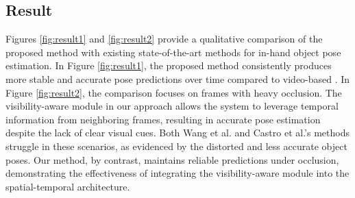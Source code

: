 \subsection{Result}

Figures \ref{fig:result1} and \ref{fig:result2} provide a qualitative comparison of the proposed method with existing state-of-the-art methods for in-hand object pose estimation. In Figure \ref{fig:result1}, the proposed method consistently produces more stable and accurate pose predictions over time compared to \DIFdelbegin {}\DIFdelend \DIFaddbegin {}\DIFaddend video-based \DIFdelbegin {}\DIFdelend \DIFaddbegin {}\DIFaddend . In Figure \ref{fig:result2}, the comparison focuses on frames with heavy occlusion. The visibility-aware module in our approach allows the system to leverage temporal information from neighboring frames, resulting in accurate pose estimation despite the lack of clear visual cues. Both Wang et al. and Castro et al.'s methods struggle in these scenarios, as evidenced by the distorted and less accurate object poses. Our method, by contrast, maintains reliable predictions under occlusion, demonstrating the effectiveness of integrating the visibility-aware module into the spatial-temporal architecture.


